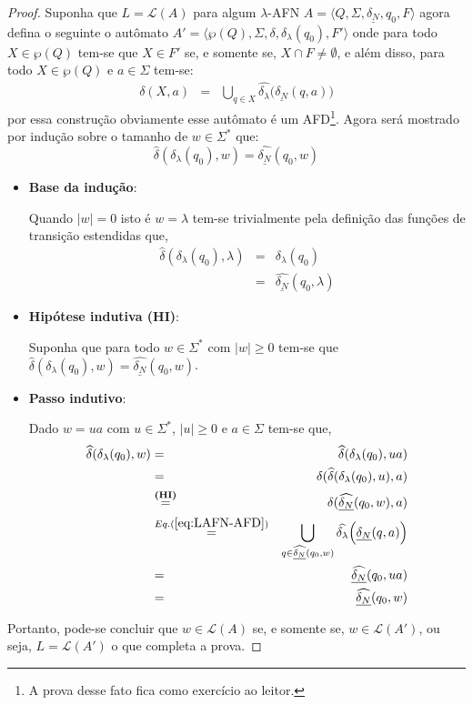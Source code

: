 \begin{proof}
	Suponha que $L = \mathcal{L}(A)$ para algum $\lambda$-AFN $A =  \langle Q, \Sigma, \underline{\delta_N}, q_0, F \rangle$ agora defina o seguinte o autômato $A' = \langle \wp(Q), \Sigma, \delta, \delta_\lambda(q_0), F' \rangle$ onde para todo $X \in \wp(Q)$ tem-se que $X \in F'$ se, e somente se, $X \cap F \neq \emptyset$, e além disso, para todo $X \in \wp(Q)$ e $a \in \Sigma$ tem-se:
	\begin{eqnarray}\label{eq:LAFN-AFD}
		\delta(X, a) & = & \bigcup_{q \in X} \widehat{\delta_\lambda}\Big(\underline{\delta_N}(q, a)\Big)
	\end{eqnarray}
	por essa construção obviamente esse autômato é um AFD\footnote{A prova desse fato fica como exercício ao leitor.}. Agora será mostrado por indução sobre o tamanho de $w \in \Sigma^*$ que:
	$$\widehat{\delta}(\delta_\lambda(q_0), w) = \widehat{\underline{\delta_N}}(q_0, w)$$
	\begin{itemize}
		\item \textbf{Base da indução}:
		
		Quando $|w| = 0$ isto é $w = \lambda$ tem-se trivialmente pela definição das funções de transição estendidas que, 
		\begin{eqnarray*}
			\widehat{\delta}(\delta_\lambda(q_0), \lambda) & = & \delta_\lambda(q_0)\\
			& = & \widehat{\underline{\delta_N}}(q_0, \lambda)
		\end{eqnarray*}
		
		\item \textbf{Hipótese indutiva (HI)}:
		
		Suponha que para todo $w \in \Sigma^*$ com $|w| \geq 0$ tem-se que $\widehat{\delta}(\delta_\lambda(q_0), w) = \widehat{\underline{\delta_N}}(q_0, w)$.
		\item \textbf{Passo indutivo}:
		
		Dado $w = ua$ com $u \in \Sigma^*$, $|u| \geq 0$ e $a \in \Sigma$ tem-se que, 
		\begin{eqnarray*}
			\widehat{\delta}(\delta_\lambda(q_0), w) & = & \widehat{\delta}(\delta_\lambda(q_0), ua)\\
			& = & \delta(\widehat{\delta}(\delta_\lambda(q_0), u), a)\\
			& \stackrel{\textbf{(HI)}}{=} & \delta(\widehat{\underline{\delta_N}}(q_0, w), a)\\
			& \stackrel{Eq. (\ref{eq:LAFN-AFD})}{=} & \bigcup_{q \in \widehat{\underline{\delta_N}}(q_0, w)} \widehat{\delta_\lambda}\Big(\underline{\delta_N}(q, a)\Big)\\
			& = & \widehat{\underline{\delta_N}}(q_0, ua)\\
			& = & \widehat{\underline{\delta_N}}(q_0, w)
		\end{eqnarray*}
	\end{itemize}
	Portanto, pode-se concluir que $w \in \mathcal{L}(A)$ se, e somente se, $w \in \mathcal{L}(A')$, ou seja, $L = \mathcal{L}(A')$ o que completa a prova.
\end{proof}

